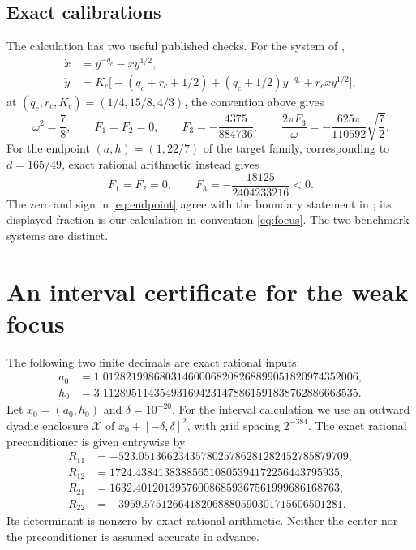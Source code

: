 \documentclass[11pt,a4paper]{article}
\theoremstyle{remark}
\numberwithin{equation}{section}
\begin{document}
\subsection{Exact calibrations}
The calculation has two useful published checks. For the system of
\cite[equation~(12), Proposition~3]{BorosHofbauer2024},
\begin{equation}\label{eq:calibration}
 \begin{split}
 \dot x&=y^{-q_c}-xy^{1/2},\\
 \dot y&=K_c\bigl[-(q_c+r_c+1/2)+(q_c+1/2)y^{-q_c}+r_cxy^{1/2}\bigr],
 \end{split}
\end{equation}
at $(q_c,r_c,K_c)=(1/4,15/8,4/3)$, the convention above gives
\begin{equation}\label{eq:benchmark}
 \omega^2=\frac78,\qquad F_1=F_2=0,\qquad
 F_3=-\frac{4375}{884736},\qquad
 \frac{2\pi F_3}{\omega}=-\frac{625\pi}{110592}\sqrt{\frac72}.
\end{equation}
For the endpoint $(a,h)=(1,22/7)$ of the target family, corresponding
to $d=165/49$, exact rational arithmetic instead gives
\begin{equation}\label{eq:endpoint}
 F_1=F_2=0,\qquad F_3=-\frac{18125}{2404233216}<0.
\end{equation}
The zero and sign in \eqref{eq:endpoint} agree with the boundary
statement in \cite[Section~5.1]{BorosHofbauer2024}; its displayed fraction
is our calculation in convention \eqref{eq:focus}. The two benchmark
systems are distinct.

\section{An interval certificate for the weak focus}\label{sec:certificate}
The following two finite decimals are exact rational inputs:
\begin{equation}\label{eq:center}
 \begin{split}
 a_0&=1.012821998680314600068208268899051820974352006,\\
 h_0&=3.112895114354931694231478861591838762886663535.
 \end{split}
\end{equation}
Let $x_0=(a_0,h_0)$ and $\delta=10^{-20}$. For the interval calculation
we use an outward dyadic enclosure $\mathcal X$ of
$x_0+[-\delta,\delta]^2$, with grid spacing $2^{-384}$. The exact
rational preconditioner is given entrywise by
\begin{equation}\label{eq:preconditioner}
 \begin{split}
 R_{11}&=-523.0513662343578025786281282452785879709,\\
 R_{12}&= 1724.438413838856510805394172256443795935,\\
 R_{21}&= 1632.401201395760086859367561999686168763,\\
 R_{22}&=-3959.57512664182068880590301715606501281.
 \end{split}
\end{equation}
Its determinant is nonzero by exact rational arithmetic. Neither the
center nor the preconditioner is assumed accurate in advance.
\end{document}
